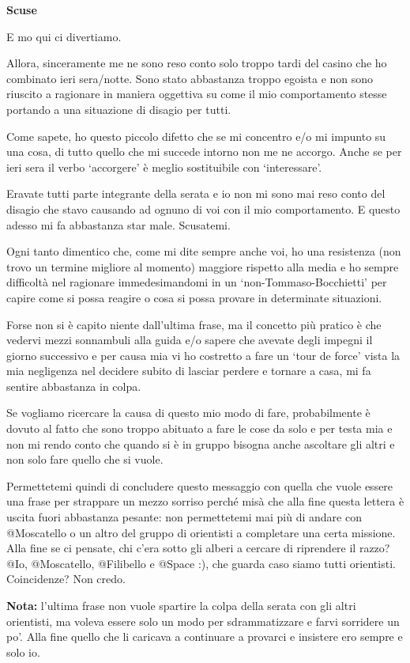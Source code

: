 \documentclass[12pt, a4paper]{article}
\begin{document}
\textbf{Scuse}

E mo qui ci divertiamo.

Allora, sinceramente me ne sono reso conto solo troppo tardi del casino che ho combinato ieri sera/notte. Sono stato abbastanza troppo egoista e non sono riuscito a ragionare in maniera oggettiva su come il mio comportamento stesse portando a una situazione di disagio per tutti.

Come sapete, ho questo piccolo difetto che se mi concentro e/o mi impunto su una cosa, di tutto quello che mi succede intorno non me ne accorgo. Anche se per ieri sera il verbo `accorgere' è meglio sostituibile con `interessare'.

Eravate tutti parte integrante della serata e io non mi sono mai reso conto del disagio che stavo causando ad ognuno di voi con il mio comportamento. E questo adesso mi fa abbastanza star male. Scusatemi.

Ogni tanto dimentico che, come mi dite sempre anche voi, ho una resistenza (non trovo un termine migliore al momento) maggiore rispetto alla media e ho sempre difficoltà nel ragionare immedesimandomi in un `non-Tommaso-Bocchietti' per capire come si possa reagire o cosa si possa provare in determinate situazioni.

Forse non si è capito niente dall'ultima frase, ma il concetto più pratico è che vedervi mezzi sonnambuli alla guida e/o sapere che avevate degli impegni il giorno successivo e per causa mia vi ho costretto a fare un `tour de force' vista la mia negligenza nel decidere subito di lasciar perdere e tornare a casa, mi fa sentire abbastanza in colpa.

Se vogliamo ricercare la causa di questo mio modo di fare, probabilmente è dovuto al fatto che sono troppo abituato a fare le cose da solo e per testa mia e non mi rendo conto che quando si è in gruppo bisogna anche ascoltare gli altri e non solo fare quello che si vuole.

Permettetemi quindi di concludere questo messaggio con quella che vuole essere una frase per strappare un mezzo sorriso perché misà che alla fine questa lettera è uscita fuori abbastanza pesante: non permettetemi mai più di andare con @Moscatello o un altro del gruppo di orientisti a completare una certa missione.
Alla fine se ci pensate, chi c'era sotto gli alberi a cercare di riprendere il razzo? @Io, @Moscatello, @Filibello e @Space :), che guarda caso siamo tutti orientisti. Coincidenze? Non credo.

\textbf{Nota:} l'ultima frase non vuole spartire la colpa della serata con gli altri orientisti, ma voleva essere solo un modo per sdrammatizzare e farvi sorridere un po'. Alla fine quello che li caricava a continuare a provarci e insistere ero sempre e solo io.
\end{document}
